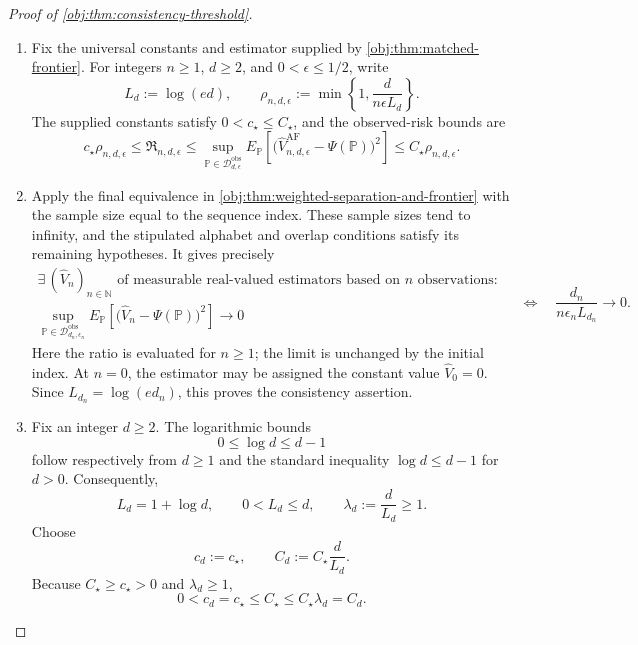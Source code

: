 \documentclass[11pt]{article}
\begin{document}
\begin{proof}[Proof of \cref{obj:thm:consistency-threshold}]
\begin{enumerate}
\item Fix the universal constants and estimator supplied by
\cref{obj:thm:matched-frontier}. For integers \(n\ge1\), \(d\ge2\), and
\(0<\epsilon\le1/2\), write
\[
L_d:=\log(ed),
\qquad
\rho_{n,d,\epsilon}
:=\min\left\{1,\frac{d}{n\epsilon L_d}\right\}.
\]
The supplied constants satisfy \(0<c_\star\le C_\star\), and the observed-risk bounds are
\[
c_\star\rho_{n,d,\epsilon}
\le \mathfrak R_{n,d,\epsilon}
\le
\sup_{\mathbb P\in\mathcal D_{d,\epsilon}^{\mathrm{obs}}}
E_{\mathbb P}\!\left[
\bigl(\widehat V_{n,d,\epsilon}^{\mathrm{AF}}-\Psi(\mathbb P)\bigr)^2
\right]
\le C_\star\rho_{n,d,\epsilon}.
\]

\item Apply the final equivalence in
\cref{obj:thm:weighted-separation-and-frontier} with the sample size equal to the sequence index. These sample sizes tend to infinity, and the stipulated alphabet and overlap conditions satisfy its remaining hypotheses. It gives precisely
\[
\begin{gathered}
\exists\,(\widehat V_n)_{n\in\mathbb N}
\text{ of measurable real-valued estimators based on \(n\) observations}:\\
\sup_{\mathbb P\in\mathcal D_{d_n,\epsilon_n}^{\mathrm{obs}}}
E_{\mathbb P}\!\left[
\bigl(\widehat V_n-\Psi(\mathbb P)\bigr)^2
\right]\longrightarrow0
\end{gathered}
\quad\Longleftrightarrow\quad
\frac{d_n}{n\epsilon_n L_{d_n}}\longrightarrow0.
\]
Here the ratio is evaluated for \(n\ge1\); the limit is unchanged by the initial index. At \(n=0\), the estimator may be assigned the constant value
\(\widehat V_0=0\). Since \(L_{d_n}=\log(ed_n)\), this proves the consistency assertion.

\item Fix an integer \(d\ge2\). The logarithmic bounds
\[
0\le\log d\le d-1
\]
follow respectively from \(d\ge1\) and the standard inequality
\(\log d\le d-1\) for \(d>0\). Consequently,
\[
L_d=1+\log d,
\qquad
0<L_d\le d,
\qquad
\lambda_d:=\frac{d}{L_d}\ge1.
\]
Choose
\[
c_d:=c_\star,
\qquad
C_d:=C_\star\frac{d}{L_d}.
\]
Because \(C_\star\ge c_\star>0\) and \(\lambda_d\ge1\),
\[
0<c_d=c_\star\le C_\star
\le C_\star\lambda_d=C_d.
\]


\end{enumerate}
\end{proof}
\end{document}
